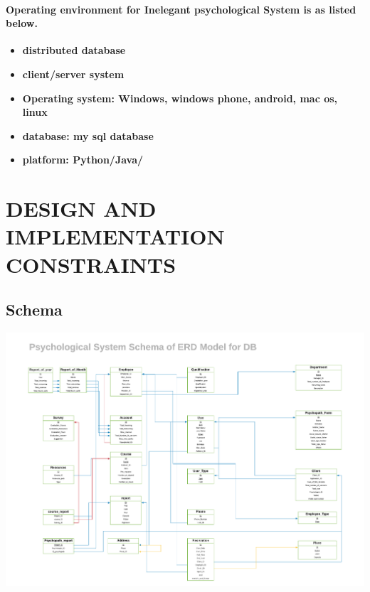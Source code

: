 \documentclass[../Psychological_system_web_application.tex]{subfiles}
\begin{document}
			\paragraph{Operating environment for Inelegant psychological System is as listed below.}
				\begin{itemize}
					\item
							\textbf{distributed \gls{database}}
					\item
							\textbf{client/server system}
					\item
							\textbf{Operating system: Windows, windows phone, android, mac os, linux}
					\item
							\textbf{database: my sql database}
					\item
							\textbf{platform: Python/Java/}
				\end{itemize}
		
		\section{DESIGN AND IMPLEMENTATION CONSTRAINTS}
			
			\subsection{Schema}
			
				\includegraphics[width=\textwidth ,height=0.9\textheight ,scale=4]{Diagrams/Psychological_schema.pdf}				
				
\end{document}
